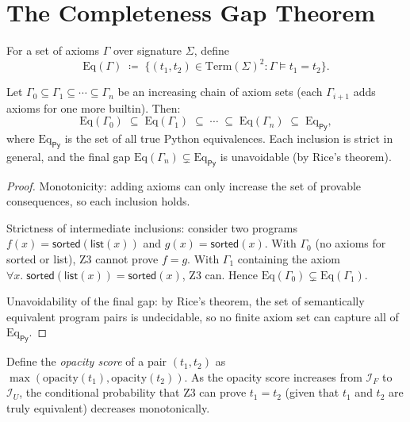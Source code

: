 \section{The Completeness Gap Theorem}
\label{sec:completeness-gap}

\begin{definition}
\label{def:provable-equiv}
For a set of axioms $\Gamma$ over signature $\Sigma$, define
\[
  \mathrm{Eq}(\Gamma)
  \;\coloneqq\;
  \bigl\{ (t_1, t_2) \in \mathrm{Term}(\Sigma)^2
    : \Gamma \models t_1 = t_2 \bigr\}.
\]
\end{definition}

\begin{theorem}
\label{thm:completeness-gap}
Let $\Gamma_0 \subseteq \Gamma_1 \subseteq \cdots \subseteq
\Gamma_n$ be an increasing chain of axiom sets (each $\Gamma_{i+1}$
adds axioms for one more builtin).  Then:
\[
  \mathrm{Eq}(\Gamma_0)
  \;\subseteq\;
  \mathrm{Eq}(\Gamma_1)
  \;\subseteq\;
  \cdots
  \;\subseteq\;
  \mathrm{Eq}(\Gamma_n)
  \;\subseteq\;
  \mathrm{Eq}_{\mathsf{Py}},
\]
where $\mathrm{Eq}_{\mathsf{Py}}$ is the set of all true Python
equivalences.  Each inclusion is strict in general, and the final
gap $\mathrm{Eq}(\Gamma_n) \subsetneq \mathrm{Eq}_{\mathsf{Py}}$
is unavoidable (by Rice's theorem).
\end{theorem}

\begin{proof}
Monotonicity: adding axioms can only increase the set of
provable consequences, so each inclusion holds.

Strictness of intermediate inclusions: consider two programs
$f(x) = \mathsf{sorted}(\mathsf{list}(x))$ and $g(x) = \mathsf{sorted}(x)$.
With $\Gamma_0$ (no axioms for \textsf{sorted} or \textsf{list}),
Z3 cannot prove $f = g$.  With $\Gamma_1$ containing the axiom
$\forall x.\;\mathsf{sorted}(\mathsf{list}(x)) = \mathsf{sorted}(x)$,
Z3 can.  Hence $\mathrm{Eq}(\Gamma_0) \subsetneq \mathrm{Eq}(\Gamma_1)$.

Unavoidability of the final gap: by Rice's theorem, the set of
semantically equivalent program pairs is undecidable, so no finite
axiom set can capture all of $\mathrm{Eq}_{\mathsf{Py}}$.
\end{proof}

\begin{proposition}
\label{prop:opacity-completeness}
Define the \emph{opacity score} of a pair $(t_1, t_2)$ as
$\max(\mathrm{opacity}(t_1), \mathrm{opacity}(t_2))$.
As the opacity score increases from $\mathcal{I}_F$ to
$\mathcal{I}_U$, the conditional probability that Z3 can prove
$t_1 = t_2$ (given that $t_1$ and $t_2$ are truly equivalent)
decreases monotonically.
\end{proposition}


